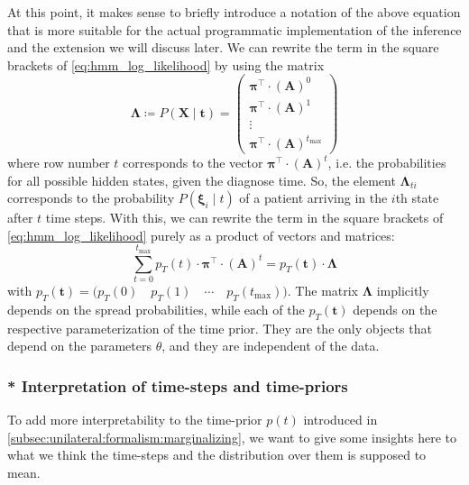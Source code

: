 \documentclass[\relativeRoot/main.tex]{subfiles}
\begin{document}
At this point, it makes sense to briefly introduce a notation of the above equation that is more suitable for the actual programmatic implementation of the inference and the extension we will discuss later. We can rewrite the term in the square brackets of \cref{eq:hmm_log_likelihood} by using the matrix
%
\begin{equation} \label{eq:hmm_matrix_lambda}
    \boldsymbol{\Lambda} \coloneqq 
    P \left( \mathbf{X} \mid \mathbf{t} \right) = 
    \begin{pmatrix}
        \boldsymbol{\pi}^\top \cdot \left( \mathbf{A} \right)^0 \\
        \boldsymbol{\pi}^\top \cdot \left( \mathbf{A} \right)^1 \\
        \vdots \\
        \boldsymbol{\pi}^\top \cdot \left( \mathbf{A} \right)^{t_\text{max}}
    \end{pmatrix}
\end{equation}
%
where row number $t$ corresponds to the vector $\boldsymbol{\pi}^\top \cdot \left( \mathbf{A} \right)^t$, i.e. the probabilities for all possible hidden states, given the diagnose time. So, the element $\boldsymbol{\Lambda}_{ti}$ corresponds to the probability $P \left( \boldsymbol{\xi}_i \mid t \right)$ of a patient arriving in the $i$th state after $t$ time steps. With this, we can rewrite the term in the square brackets of \cref{eq:hmm_log_likelihood} purely as a product of vectors and matrices:
%
\begin{equation}
    \sum_{t = 0}^{t_\text{max}}{p_T (t) \cdot \boldsymbol{\pi}^\top \cdot (\mathbf{A})^t} = p_T \left( \mathbf{t} \right) \cdot \boldsymbol{\Lambda}
\end{equation}
%
with $p_T \left( \mathbf{t} \right) = \big( p_T(0) \quad p_T(1) \quad \cdots \quad p_T(t_\text{max}) \big)$. The matrix $\boldsymbol{\Lambda}$ implicitly depends on the spread probabilities, while each of the $p_T(\mathbf{t})$ depends on the respective parameterization of the time prior. They are the only objects that depend on the parameters $\theta$, and they are independent of the data.


\subsubsection*{* Interpretation of time-steps and time-priors}
\label{subsubsec:unilateral:formalism:tstage:interpretation}

To add more interpretability to the time-prior $p(t)$ introduced in \cref{subsec:unilateral:formalism:marginalizing}, we want to give some insights here to what we think the time-steps and the distribution over them is supposed to mean.
\end{document}
